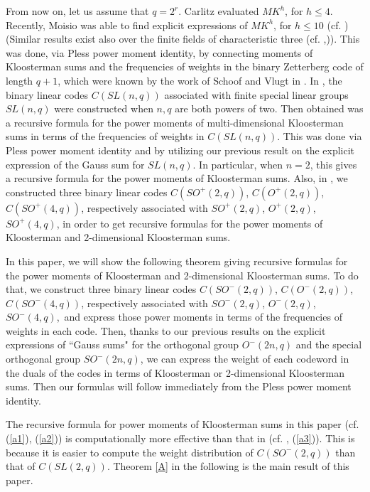 \documentclass[a4,12pt]{elsart}
\begin{document}
From now on, let us assume that $q=2^{r}$. Carlitz \cite{L1}
evaluated $MK^{h}$, for $h\leq 4$. Recently, Moisio was able to find
explicit expressions of $MK^{h}$, for $h \leq 10$ (cf.
\cite{M1})(Similar results exist also over the finite fields of
characteristic three (cf. \cite{GM},\cite{M2})). This was done, via
Pless power moment identity, by connecting moments of Kloosterman
sums and the frequencies of weights in the binary Zetterberg code of
length $q+1$, which were known by the work of Schoof and Vlugt in
\cite{RS}.  In \cite{D2}, the binary linear codes $C(SL(n,q))$
associated with finite special linear groups $SL(n,q)$ were
constructed when $n,q$ are both powers of two. Then obtained was a
recursive formula for the power moments of multi-dimensional
Kloosterman sums in terms of the frequencies of weights in
$C(SL(n,q))$. This was done via Pless power moment identity and by
utilizing our previous result on the explicit expression of the
Gauss sum for $SL(n,q)$. In particular, when $n=2$, this gives a
recursive formula for the power moments of Kloosterman sums. Also,
in \cite{D3}, we constructed three binary linear codes $C(SO^+(2,q))
$, $ C(O^+(2,q))$, $C(SO^+(4,q))$, respectively associated with
$SO^+(2,q)$, $ O^+(2,q)$, $SO^+(4,q)$, in order to get recursive
formulas for the power moments of Kloosterman and 2-dimensional
Kloosterman sums.

In this paper, we will show the following theorem giving recursive
formulas for the power moments of Kloosterman and 2-dimensional
Kloosterman sums. To do that, we construct three binary linear codes
$C(SO^-(2,q))$, $C(O^-(2,q))$, $C(SO^-(4,q))$, respectively
associated with $SO^-(2,q)$, $O^-(2,q)$, $SO^-(4,q)$,~and express
those power moments in terms of the frequencies of weights in each
code. Then, thanks to our previous results on the explicit
expressions of ``Gauss sums" for the orthogonal  group $O^-(2n,q)$
and the special orthogonal group $SO^-(2n,q)$\cite{DY}, we can
express the weight of each codeword in the duals of the codes in
terms of Kloosterman or 2-dimensional Kloosterman sums. Then our
formulas will follow immediately from the Pless power moment
identity.

 The recursive formula for power moments of Kloosterman sums in this paper (cf. (\ref{a1}), (\ref{a2}))
 is computationally more effective than that in \cite{D2}(cf. \cite{D2}, (\ref{a3})).
 This is because it is easier to compute the weight distribution of $C(SO^-(2,q))$ than that of  $C(SL(2,q))$.
 Theorem \ref{A} in the following is the main result of this paper.
\end{document}
